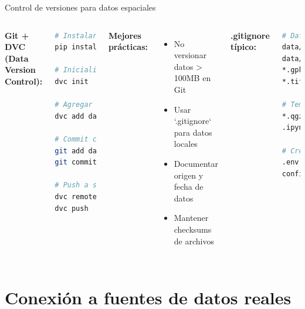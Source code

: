 \documentclass[10pt,aspectratio=169]{beamer}
\begin{document}
\begin{frame}[fragile]{Control de versiones para datos espaciales}
    \begin{columns}[T]
        \textbf{Git + DVC (Data Version Control):}
        \begin{lstlisting}[language=bash]
# Instalar DVC
pip install dvc

# Inicializar DVC en proyecto Git
dvc init

# Agregar archivo grande
dvc add data/comunas_chile.gpkg

# Commit cambios
git add data/comunas_chile.gpkg.dvc
git commit -m "Add comunas dataset"

# Push a storage remoto (S3, GCS, etc)
dvc remote add -d myremote s3://bucket/path
dvc push
        \end{lstlisting}
        
        \textbf{Mejores prácticas:}
        \begin{itemize}
            \item No versionar datos > 100MB en Git
            \item Usar `.gitignore` para datos locales
            \item Documentar origen y fecha de datos
            \item Mantener checksums de archivos
        \end{itemize}
        
        \vspace{0.3cm}
        \textbf{.gitignore típico:}
        \begin{lstlisting}[language=bash]
# Datos
data/raw/*
data/cache/*
*.gpkg
*.tif

# Temporales
*.qgz~
.ipynb_checkpoints/

# Credenciales
.env
config/secrets.yaml
        \end{lstlisting}
    \end{columns}
\end{frame}

\section{Conexión a fuentes de datos reales}
\end{document}
